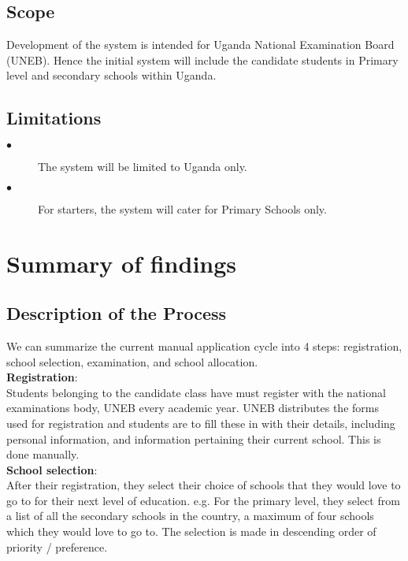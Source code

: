 \documentclass {article}
\begin{document}
\subsection{Scope}
Development of the system is intended for Uganda National Examination Board (UNEB). Hence the initial system will include the candidate students in Primary level and secondary schools within Uganda.

\subsection{Limitations}

\begin{description}
  \item[$\bullet$] The system will be limited to Uganda only.
  \item[$\bullet$] For starters, the system will cater for Primary Schools only.
\end{description}

\section{Summary of findings}


\subsection{Description of the Process}
We can summarize the current manual application cycle into 4 steps: registration, school selection, examination, and school allocation.\\

\textbf{Registration}: \\

Students belonging to the candidate class have must register with the national examinations body, UNEB every academic year. UNEB distributes the forms used for registration and students are to fill these in with their details, including personal information, and information pertaining their current school. This is done manually.\\

\textbf{School selection}:\\

After their registration, they select their choice of schools that they would love to go to for their next level of education. e.g. For the primary level, they select from a list of all the secondary schools \cite{article3} in the country, a maximum of four schools which they would love to go to. The selection is made in descending order of priority / preference.\\
\end{document}
